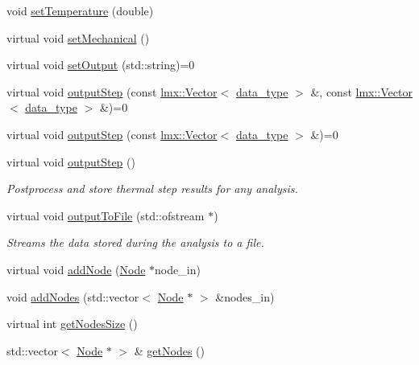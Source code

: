 \begin{DoxyCompactItemize}
\item 
void \hyperlink{classmknix_1_1_body_a7a59c0a2063ce89772d24e0fc7118dd9}{set\+Temperature} (double)
\item 
virtual void \hyperlink{classmknix_1_1_body_a863cfa7288a25874f4e4ce6d329fc26b}{set\+Mechanical} ()
\item 
virtual void \hyperlink{classmknix_1_1_body_a689970a0729d557ed56492bbfeae4ecd}{set\+Output} (std\+::string)=0
\item 
virtual void \hyperlink{classmknix_1_1_body_a2655307ec61a79f8d2e5716c984a44df}{output\+Step} (const \hyperlink{classlmx_1_1_vector}{lmx\+::\+Vector}$<$ \hyperlink{namespacemknix_a16be4b246fbf2cceb141e3a179111020}{data\+\_\+type} $>$ \&, const \hyperlink{classlmx_1_1_vector}{lmx\+::\+Vector}$<$ \hyperlink{namespacemknix_a16be4b246fbf2cceb141e3a179111020}{data\+\_\+type} $>$ \&)=0
\item 
virtual void \hyperlink{classmknix_1_1_body_a0570075194360f453b763866969548e7}{output\+Step} (const \hyperlink{classlmx_1_1_vector}{lmx\+::\+Vector}$<$ \hyperlink{namespacemknix_a16be4b246fbf2cceb141e3a179111020}{data\+\_\+type} $>$ \&)=0
\item 
virtual void \hyperlink{classmknix_1_1_body_ae41a00911e832630c5b18e874a503e34}{output\+Step} ()
\begin{DoxyCompactList}\small\item\em Postprocess and store thermal step results for any analysis. \end{DoxyCompactList}\item 
virtual void \hyperlink{classmknix_1_1_body_a65fb5dd34d3a6925f611f7ea49da5cd0}{output\+To\+File} (std\+::ofstream $\ast$)
\begin{DoxyCompactList}\small\item\em Streams the data stored during the analysis to a file. \end{DoxyCompactList}\item 
virtual void \hyperlink{classmknix_1_1_body_abf7eec507e5fc918e4901864a6db0f84}{add\+Node} (\hyperlink{classmknix_1_1_node}{Node} $\ast$node\+\_\+in)
\item 
void \hyperlink{classmknix_1_1_body_a29eb7ca2168e7674ddb553a85d43a8d8}{add\+Nodes} (std\+::vector$<$ \hyperlink{classmknix_1_1_node}{Node} $\ast$ $>$ \&nodes\+\_\+in)
\item 
virtual int \hyperlink{classmknix_1_1_body_af1e6e6589c5dfb4016e1e6af2225ae5f}{get\+Nodes\+Size} ()
\item 
std\+::vector$<$ \hyperlink{classmknix_1_1_node}{Node} $\ast$ $>$ \& \hyperlink{classmknix_1_1_body_aba386146267f71d398fb4dabb41a550c}{get\+Nodes} ()

\end{DoxyCompactItemize}

